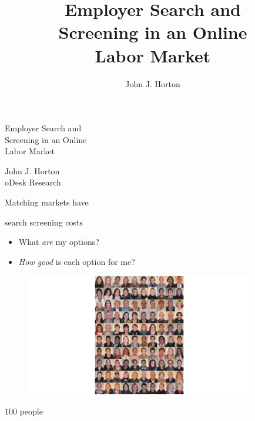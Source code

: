 \documentclass[12pt]{beamer}
\title[Employer Search and Screening in an Online Labor Market]{Employer Search and\\Screening in an Online\\Labor Market}
\author{John J. Horton}
\institute{oDesk Research}
\newcommand*\ouritem{%
\item[\color{black}\scalebox{0.9}{\textbullet}]}
\begin{document}
\setlength{\baselineskip}{12mm}
\fontsize{10mm}{12mm}\selectfont

\begin{frame}
\begin{center}
Employer Search and\\
Screening in an Online\\
Labor Market

\vspace{3mm}

\large
John J. Horton\\
oDesk Research
\end{center}
\end{frame}

\begin{frame}{}
\begin{center}
Matching markets have

search screening costs
\end{center}
\end{frame}

\begin{frame}{}
\Large
\begin{itemize}
\ouritem What \emph{are} my options?

\ouritem \emph{How good} is each option for me?
\end{itemize}
\end{frame}

\begin{frame}{}
\begin{animateinline}[autoplay]{2}
\begin{minipage}[c]{1\textwidth}
\begin{center}
\Large

\begin{figure}[H] \centering \includegraphics[width=100mm]{people_animation_1.png} \end{figure}

100 people
\end{center}
\end{minipage}
\end{animateinline}
\end{frame}
\end{document}
